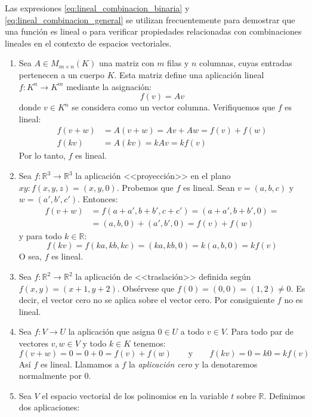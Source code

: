 \begin{tcolorbox}[interesting_data, title=Uso de la propiedad]
  Las expresiones \eqref{eq:lineal_combinacion_binaria} y \eqref{eq:lineal_combinacion_general} se utilizan frecuentemente para demostrar que una función es lineal o para verificar propiedades relacionadas con combinaciones lineales en el contexto de espacios vectoriales.
\end{tcolorbox}

\begin{enumerate}[label=\alph*.]
  \item Sea \( A \in M_{m \times n}(K) \) una matriz con \( m \) filas y \( n \) columnas, cuyas entradas pertenecen a un cuerpo \( K \). Esta matriz define una aplicación lineal \( f: K^n \rightarrow K^m \) mediante la asignación:
  \[
    f(v) = Av
  \]
  donde \( v \in K^n \) se considera como un vector columna. Verifiquemos que \( f \) es lineal:
  \begin{align*}
    f(v + w) &= A(v+w) = Av + Aw = f(v) + f(w) \\
    f(kv) &= A(kv) = kAv = kf(v)
  \end{align*}
  Por lo tanto, \( f \) es lineal.
  \item Sea \(f:\mathbb{R}^3 \rightarrow \mathbb{R}^3\) la aplicación <<proyección>> en el plano \(xy: f(x,y,z)= (x,y,0)\). Probemos que \(f\) es lineal. Sean \(v=(a,b,c)\) y \(w=(a',b',c')\). Entonces:
  \begin{align*}
    f(v+w) &= f(a+a', b+b', c+c') = (a+a', b+b',0) = \\
          &= (a,b,0) + (a',b',0) = f(v) + f(w)
  \end{align*}
  y para todo \(k \in \mathbb{R}\):
  \[
    f(kv) = f(ka,kb,kc) = (ka,kb,0) = k(a,b,0) = kf(v)
  \]
  O sea, \(f\) es lineal.
  \item Sea \(f: \mathbb{R}^2 \rightarrow \mathbb{R}^2\) la aplicación de <<traslación>> definida según \(f(x,y) = (x+1,y+2)\). Obsérvese que \(f(0)=(0,0)=(1,2)\neq 0\). Es decir, el vector cero no se aplica sobre el vector cero. Por consiguiente \(f\) no es lineal.
  \item Sea \(f:V\rightarrow U\) la aplicación que asigna \(0 \in U\) a todo \(v \in V\). Para todo par de vectores \(v,w \in V\) y todo \(k \in K\) tenemos:
  \[
    f(v+w) = 0 = 0+0 = f(v) + f(w) \qquad \text{y} \qquad f(kv) = 0 = k0 = kf(v)
  \]
  Así \(f\) es lineal. Llamamos a \(f\) la \textit{aplicación cero} y la denotaremos normalmente por \(0\).
  \item Sea \( V \) el espacio vectorial de los polinomios en la variable \( t \) sobre \( \mathbb{R} \). Definimos dos aplicaciones:

\end{enumerate}
